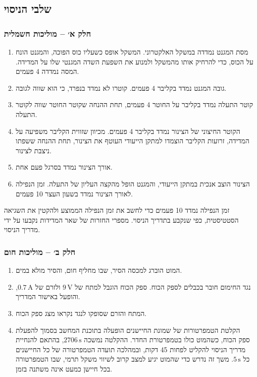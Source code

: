 \documentclass[10pt,a4paper]{article}
\newcommand{\U}[1]{\,\mathrm{#1}}
\begin{document}
\subsection*{שלבי הניסוי}
\subsubsection*{חלק א׳ -- מוליכות חשמלית}
\begin{enumerate}
  \item מסת המגנט נמדדה במשקל האלקטרוני. המשקל אופס כשעליו כוס הפוכה, והמגנט הונח על הכוס, כדי להרחיק אותו מהמשקל ולמנוע את השפעת השדה המגנטי שלו על המדידה. המסה נמדדה 4 פעמים.
  \item גובה המגנט נמדד בקליבר 4 פעמים. קוטרו לא נמדד בנפרד, כי הוא שווה לגובה.
  \item קוטר התעלה נמדד בקליבר על החוטר 4 פעמים, תחת ההנחה שקוטר החוטר שווה לקוטר התעלה.
  \item הקוטר החיצוני של הצינור נמדד בקליבר 4 פעמים. מכיוון שזווית הקליבר משפיעה על המדידה, זרועות הקליבר הוצמדו למתקן הייעודי העוטף את הצינור, תחת ההנחה ששפתו ניצבת לצינור.
  \item אורך הצינור נמדד בסרגל פעם אחת.
  \item הצינור הוצב אנכית במתקן הייעודי, והמגנט הופל מהקצה העליון של התעלה. זמן הנפילה לאורך הצינור נמדד בשעון העצר 10 פעמים.
\end{enumerate}
זמן הנפילה נמדד 10 פעמים כדי לחשב את זמן הנפילה הממוצע ולהקטין את השגיאה הסטטיסטית, כפי שנקבע בתדריך הניסוי. מספרי החזרות של שאר המדידות נקבעו על ידי מדריך הניסוי.

\subsubsection*{חלק ב׳ -- מוליכות חום}
\begin{enumerate}
  \item המוט הוברג למכסה הסיר, שבו מחליף חום, והסיר מולא במים.
  \item נגד החימום חובר בכבלים לספק הכוח. ספק הכוח הוגבל למתח של $9\U{V}$ ולזרם של $0.7\U{A}$, והופעל באישור המדריך.
  \item המתח והזרם שסופקו לנגד נקראו מצג ספק הכוח.
  \item הקלטת הטמפרטורות של שמונת החיישנים הופעלה בתוכנת המחשב בסמוך להפעלת ספק הכוח, כשהמוט כולו בטמפרטורת החדר. ההקלטה נמשכה $2706\U{s}$, בהתאם להנחיית מדריך הניסוי להקליט לפחות 45 דקות, ובמהלכה תועדה הטמפרטורה של כל החיישנים כל $5\U{s}$. משך זה נדרש כדי שהמוט יגיע למצב קרוב לשיווי משקל תרמי, שבו הטמפרטורה בכל חיישן כמעט אינה משתנה בזמן.
\end{enumerate}
\end{document}
